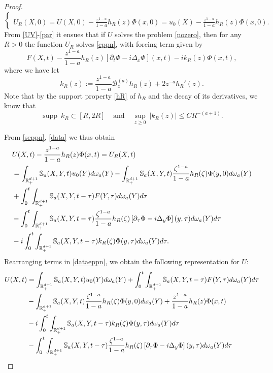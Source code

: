 \documentclass[11pt,letter]{amsart}
\def \RN {\mathbb{R}_+^{d+1}}
\newcommand{\p}{\partial}
\numberwithin{equation}{section}
\numberwithin{equation}{section}
\begin{document}
\begin{proof}
\begin{equation}
\begin{cases}
\\
U_R(X,0) = U(X,0) - \frac{z^{1-a}}{1-a} h_R(z) \Phi(x,0) = u_0(X) -  \frac{z^{1-a}}{1-a} h_R(z) \Phi(x,0).
\end{cases}
\end{equation}
From \eqref{UV}-\eqref{par} it ensues that if $U$ solves the problem \eqref{nozero}, 
then for any $R>0$ the function $U_R$ solves \eqref{eppn}, with forcing term given by
\begin{equation}\label{data}
F(X,t) - \frac{z^{1-a}}{1-a} h_R(z)\left[\p_t \Phi - i  \Delta_x \Phi\right](x,t) - i k_R(z) \Phi(x,t),
\end{equation} 
where we have let
\[
k_R(z) := \frac{z^{1-a}}{1-a}\mathscr B_z^{(a)}h_R(z) + 2 z^{-a} h_R'(z).
\]
Note that by the support property \eqref{hR} of $h_R$ and the decay of its derivatives, we know that 
\begin{equation}\label{decay}
\operatorname{supp}\ k_R\subset [R,2R]\ \ \ \ \ \text{and}\ \ \ \ \ \underset{z\ge 0}{\sup}\ |k_R(z)|\le C R^{-(a+1)}.
\end{equation} 

From \eqref{seppn}, \eqref{data} we thus obtain
\begin{align}\label{dataeppn}
& U(X,t) - \frac{z^{1-a}}{1-a} h_R(z) \Phi(x,t) = U_R(X,t)
\\
&  = \int_{\RN} \mathbb S_a(X,Y,t) u_0(Y)d\omega_a(Y) - \int_{\RN} \mathbb S_a(X,Y,t) \frac{\zeta^{1-a}}{1-a} h_R(\zeta)\Phi(y,0) d\omega_a(Y)
\notag
\\
&  + \int_0^t \int_{\RN} \mathbb S_a(X,Y,t-\tau) F(Y,\tau) d\omega_a(Y) d\tau
\notag\\
& - \int_0^t \int_{\RN} \mathbb S_a(X,Y,t-\tau) \frac{\zeta^{1-a}}{1-a} h_R(\zeta)\left[\p_\tau \Phi - i  \Delta_y \Phi\right](y,\tau) d\omega_a(Y) d\tau
\notag
\\
& - i \int_0^t \int_{\RN} \mathbb S_a(X,Y,t-\tau) k_R(\zeta) \Phi(y,\tau) d\omega_a(Y) d\tau.
\notag
\end{align}
Rearranging terms in \eqref{dataeppn}, we obtain the following representation for $U$:
\begin{align}\label{U}
U(X,t) & =  \int_{\RN} \mathbb S_a(X,Y,t) u_0(Y)d\omega_a(Y) +  \int_0^t \int_{\RN} \mathbb S_a(X,Y,t-\tau) F(Y,\tau) d\omega_a(Y) d\tau
\\
& - \int_{\RN} \mathbb S_a(X,Y,t) \frac{\zeta^{1-a}}{1-a} h_R(\zeta)\Phi(y,0) d\omega_a(Y) + \frac{z^{1-a}}{1-a} h_R(z) \Phi(x,t) 
\notag
\\
& - i \int_0^t \int_{\RN} \mathbb S_a(X,Y,t-\tau) k_R(\zeta) \Phi(y,\tau) d\omega_a(Y) d\tau
\notag\\
& - \int_0^t \int_{\RN} \mathbb S_a(X,Y,t-\tau) \frac{\zeta^{1-a}}{1-a} h_R(\zeta)\left[\p_\tau \Phi - i  \Delta_y \Phi\right](y,\tau) d\omega_a(Y) d\tau 
\notag
\end{align}


\end{proof}
\end{document}
